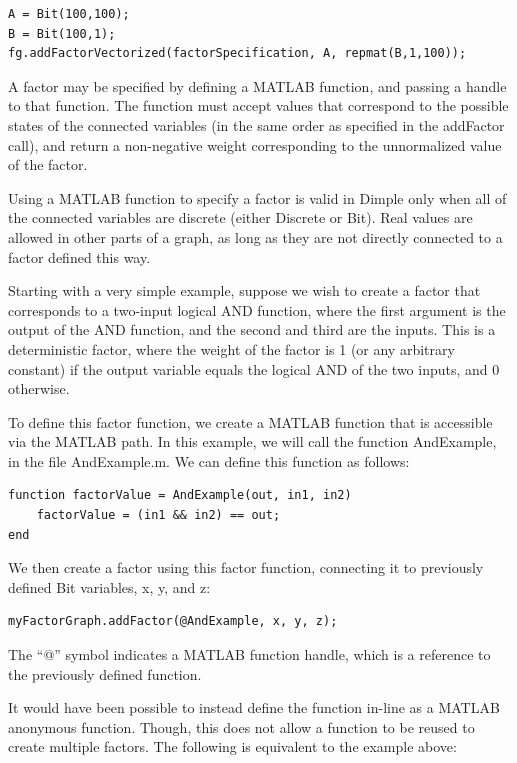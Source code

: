 \begin{lstlisting}
A = Bit(100,100);
B = Bit(100,1);
fg.addFactorVectorized(factorSpecification, A, repmat(B,1,100));
\end{lstlisting}




A factor may be specified by defining a MATLAB function, and passing a handle to that function.  The function must accept values that correspond to the possible states of the connected variables (in the same order as specified in the addFactor call), and return a non-negative weight corresponding to the unnormalized value of the factor.

Using a MATLAB function to specify a factor is valid in Dimple only when all of the connected variables are discrete (either Discrete or Bit).  Real values are allowed in other parts of a graph, as long as they are not directly connected to a factor defined this way.

Starting with a very simple example, suppose we wish to create a factor that corresponds to a two-input logical AND function, where the first argument is the output of the AND function, and the second and third are the inputs.  This is a deterministic factor, where the weight of the factor is 1 (or any arbitrary constant) if the output variable equals the logical AND of the two inputs, and 0 otherwise.

To define this factor function, we create a MATLAB function that is accessible via the MATLAB path.  In this example, we will call the function AndExample, in the file AndExample.m.  We can define this function as follows:

\begin{lstlisting}
function factorValue = AndExample(out, in1, in2)
    factorValue = (in1 && in2) == out;
end
\end{lstlisting}

We then create a factor using this factor function, connecting it to previously defined Bit variables, x, y, and z:

\begin{lstlisting}
myFactorGraph.addFactor(@AndExample, x, y, z);	
\end{lstlisting}

The ``@'' symbol indicates a MATLAB function handle, which is a reference to the previously defined function.

It would have been possible to instead define the function in-line as a MATLAB anonymous function.  Though, this does not allow a function to be reused to create multiple factors.  The following is equivalent to the example above:

